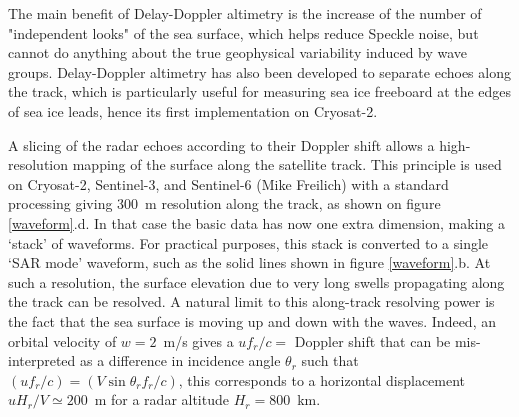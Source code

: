 The main benefit of Delay-Doppler altimetry is the increase of the number of "independent looks" of the sea surface, which helps reduce Speckle noise, but cannot do anything about the true geophysical variability induced by wave groups. Delay-Doppler altimetry has also been developed to separate echoes along the track, which is particularly useful for measuring sea ice freeboard at the edges of sea ice leads, hence its first implementation on Cryosat-2. 


A slicing of the radar echoes according to their Doppler shift allows a high-resolution mapping of the surface along the satellite track. 
This principle is used on  Cryosat-2, Sentinel-3, and Sentinel-6 (Mike Freilich) with a standard processing giving 300~m resolution along the track, as shown on figure \ref{waveform}.d. In that case the basic 
data has now one extra dimension, making a `stack' of waveforms. For practical purposes, this stack is converted to a single `SAR mode' waveform, such as the solid lines 
shown in figure \ref{waveform}.b. 
At such a  resolution, the surface elevation due to  very long swells propagating along the track can be resolved. 
A natural limit to this along-track resolving power is the fact that the sea surface is moving up and down with the waves. Indeed, an orbital velocity 
of $w=2$~m/s gives a $u f_r / c=$ Doppler shift that can be mis-interpreted as a difference in incidence angle $\theta_r$ such that  
$(u f_r / c)=(V \sin\theta_r  f_r/c)$, this corresponds to a horizontal displacement $u H_r/V \simeq 200$~m for a radar altitude 
$H_r = 800$~km. 





